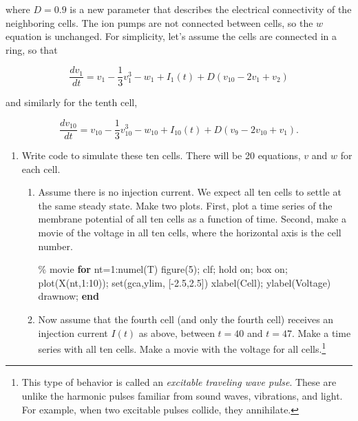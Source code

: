 \documentclass[
  letterpaper,
  DIV=11,
  numbers=noendperiod]{scrartcl}
\newenvironment{Shaded}{\begin{snugshade}}{\end{snugshade}}
\newcommand{\CommentTok}[1]{\textcolor[rgb]{0.37,0.37,0.37}{#1}}
\newcommand{\FloatTok}[1]{\textcolor[rgb]{0.68,0.00,0.00}{#1}}
\newcommand{\KeywordTok}[1]{\textcolor[rgb]{0.00,0.23,0.31}{\textbf{#1}}}
\newcommand{\NormalTok}[1]{\textcolor[rgb]{0.00,0.23,0.31}{#1}}
\newcommand{\OperatorTok}[1]{\textcolor[rgb]{0.37,0.37,0.37}{#1}}
\newcommand{\SpecialStringTok}[1]{\textcolor[rgb]{0.13,0.47,0.30}{#1}}
\newcommand{\VariableTok}[1]{\textcolor[rgb]{0.07,0.07,0.07}{#1}}
\begin{document}
where \(D=0.9\) is a new parameter that describes the electrical
connectivity of the neighboring cells. The ion pumps are not connected
between cells, so the \(w\) equation is unchanged. For simplicity, let's
assume the cells are connected in a ring, so that

\[\frac{dv_1}{dt} = v_1 - \frac{1}{3} v_1^3 - w_1 + I_1(t) + D\left( v_{10} - 2 v_1 + v_{2}\right)\]

and similarly for the tenth cell,

\[\frac{dv_{10}}{dt} = v_{10} - \frac{1}{3} v_{10}^3 - w_{10} + I_{10}(t) + D\left( v_{9} - 2 v_{10} + v_{1}\right).\]

\begin{enumerate}
\def\labelenumi{\alph{enumi}.}
\setcounter{enumi}{3}
\item
  Write code to simulate these ten cells. There will be 20 equations,
  \(v\) and \(w\) for each cell.

  \begin{enumerate}
  \def\labelenumii{\roman{enumii}.}
  \item
    Assume there is no injection current. We expect all ten cells to
    settle at the same steady state. Make two plots. First, plot a time
    series of the membrane potential of all ten cells as a function of
    time. Second, make a movie of the voltage in all ten cells, where
    the horizontal axis is the cell number.

\begin{Shaded}
\begin{Highlighting}[]
\CommentTok{\% movie}
\KeywordTok{for} \VariableTok{nt}\OperatorTok{=}\FloatTok{1}\OperatorTok{:}\VariableTok{numel}\NormalTok{(}\VariableTok{T}\NormalTok{)}
    \VariableTok{figure}\NormalTok{(}\FloatTok{5}\NormalTok{)}\OperatorTok{;} \VariableTok{clf}\OperatorTok{;} \VariableTok{hold} \VariableTok{on}\OperatorTok{;} \VariableTok{box} \VariableTok{on}\OperatorTok{;}
    \VariableTok{plot}\NormalTok{(}\VariableTok{X}\NormalTok{(}\VariableTok{nt}\OperatorTok{,}\FloatTok{1}\OperatorTok{:}\FloatTok{10}\NormalTok{))}\OperatorTok{;}
    \VariableTok{set}\NormalTok{(}\VariableTok{gca}\OperatorTok{,}\SpecialStringTok{\textquotesingle{}ylim\textquotesingle{}}\OperatorTok{,}\NormalTok{ [}\OperatorTok{{-}}\FloatTok{2.5}\OperatorTok{,}\FloatTok{2.5}\NormalTok{])}
    \VariableTok{xlabel}\NormalTok{(}\SpecialStringTok{\textquotesingle{}Cell\textquotesingle{}}\NormalTok{)}\OperatorTok{;}
    \VariableTok{ylabel}\NormalTok{(}\SpecialStringTok{\textquotesingle{}Voltage\textquotesingle{}}\NormalTok{)}
    \VariableTok{drawnow}\OperatorTok{;}
\KeywordTok{end}
\end{Highlighting}
\end{Shaded}
  \item
    Now assume that the fourth cell (and only the fourth cell) receives
    an injection current \(I(t)\) as above, between \(t=40\) and
    \(t=47\). Make a time series with all ten cells. Make a movie with
    the voltage for all cells.\footnote{This type of behavior is called
      an \emph{excitable traveling wave pulse}. These are unlike the
      harmonic pulses familiar from sound waves, vibrations, and light.
      For example, when two excitable pulses collide, they annihilate.}


\end{enumerate}
\end{enumerate}
\end{document}
